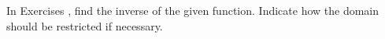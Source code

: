 {\noindent In Exercises}
{, find the inverse of the given function. Indicate how the domain should be restricted if necessary.}
